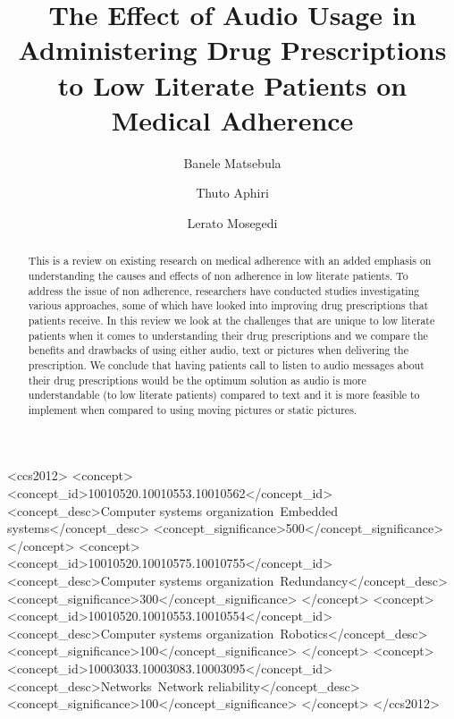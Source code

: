 \documentclass[sigconf]{acmart}
\begin{document}
\title{The Effect of Audio Usage in Administering Drug Prescriptions to Low Literate Patients on Medical Adherence}

\author{Banele Matsebula}

\author{Thuto Aphiri}

\author{Lerato Mosegedi}

\begin{abstract}
This is a review on existing research on medical adherence with an added emphasis on understanding the causes and effects of non adherence in low literate patients. To address the issue of non adherence, researchers have conducted studies investigating various approaches, some of which have looked into improving drug prescriptions that patients receive. In this review we look at the challenges that are unique to low literate patients when it comes to understanding their drug prescriptions and we compare the benefits and drawbacks of using either audio, text or pictures when delivering the prescription. We conclude that having patients call to listen to audio messages about their drug prescriptions would be the optimum solution as audio is more understandable (to low literate patients) compared to text and it is more feasible to implement when compared to using moving pictures or static pictures.
\end{abstract}

%
%
\begin{CCSXML}
<ccs2012>
 <concept>
  <concept_id>10010520.10010553.10010562</concept_id>
  <concept_desc>Computer systems organization~Embedded systems</concept_desc>
  <concept_significance>500</concept_significance>
 </concept>
 <concept>
  <concept_id>10010520.10010575.10010755</concept_id>
  <concept_desc>Computer systems organization~Redundancy</concept_desc>
  <concept_significance>300</concept_significance>
 </concept>
 <concept>
  <concept_id>10010520.10010553.10010554</concept_id>
  <concept_desc>Computer systems organization~Robotics</concept_desc>
  <concept_significance>100</concept_significance>
 </concept>
 <concept>
  <concept_id>10003033.10003083.10003095</concept_id>
  <concept_desc>Networks~Network reliability</concept_desc>
  <concept_significance>100</concept_significance>
 </concept>
</ccs2012>
\end{CCSXML}
\end{document}
